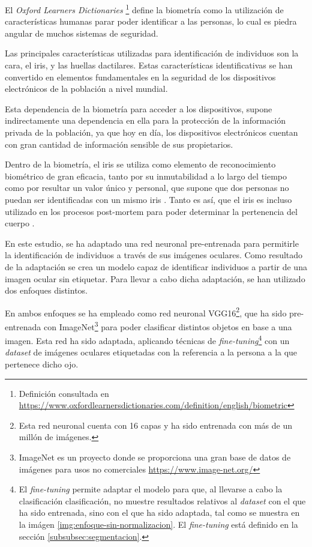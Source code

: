  \label{capitulo1}

El \textit{Oxford Learners Dictionaries} \footnote{Definición consultada en \url{https://www.oxfordlearnersdictionaries.com/definition/english/biometric}} define la biometría como la utilización de características humanas parar poder identificar a las personas, lo cual es piedra angular de muchos sistemas de seguridad.

Las principales características utilizadas para identificación de individuos son la cara, el iris, y las huellas dactilares. Estas características identificativas se han convertido en elementos fundamentales en la seguridad de los dispositivos electrónicos de la población a nivel mundial. 

Esta dependencia de la biometría para acceder a los dispositivos, supone indirectamente una dependencia en ella para la protección de la información privada de la población, ya que hoy en día, los dispositivos electrónicos cuentan con gran cantidad de información sensible de sus propietarios.

Dentro de la biometría, el iris se utiliza como elemento de reconocimiento biométrico de gran eficacia, tanto por su inmutabilidad a lo largo del tiempo como por resultar un valor único y 
personal, que supone que dos personas no puedan ser identificadas con un mismo iris \cite{malgheet_iris_2021}. Tanto es así, que el iris es incluso utilizado en los procesos 
post-mortem para poder determinar la pertenencia del cuerpo \cite{boyd_post-mortem_2020}.

En este estudio, se ha adaptado una red neuronal pre-entrenada para permitirle la identificación de individuos a través de sus imágenes oculares. Como resultado de la adaptación se crea un modelo capaz de identificar individuos a partir de una imagen ocular sin etiquetar.
Para llevar a cabo dicha adaptación, se han utilizado dos enfoques distintos.

En ambos enfoques se ha empleado como red neuronal VGG16\footnote{Esta red neuronal cuenta con 16 capas y ha sido entrenada con más de un millón de imágenes.}, que ha sido pre-entrenada con ImageNet\footnote{ImageNet es un proyecto donde se proporciona 
una gran base de datos de imágenes para usos no comerciales \url{https://www.image-net.org/}} para poder clasificar distintos objetos en base a una imagen. Esta red ha sido adaptada, aplicando técnicas de \textit{fine-tuning}\footnote{El \textit{fine-tuning} 
permite adaptar el modelo para que, al llevarse a cabo la clasificación clasificación, no muestre resultados relativos al \textit{dataset} con el que ha sido entrenada, sino con el que ha sido adaptada, tal como se muestra en la imágen \ref{img:enfoque-sin-normalizacion}. El \textit{fine-tuning} está definido en la sección \ref{subsubsec:segmentacion}.}
 con un \textit{dataset} de imágenes oculares etiquetadas con la referencia a la persona a la que pertenece dicho ojo.

